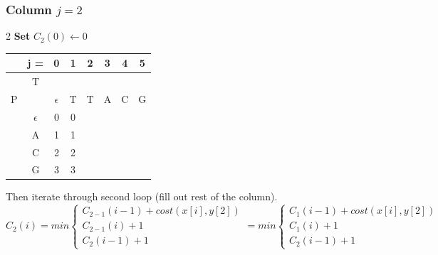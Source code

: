\subsubsection*{Column $j = 2$}
\begin{multicols}{2}
    \textbf{Set} $C_2(0) \gets 0$

    \begin{center}
        \begin{tabular}{|c c|c|c|c|c|c|c|} \hline
        &   j =  &  0           &   1   &   2   &   3   &   4   &   5   \\ \hline
        &   T    &              &       &       &       &       &       \\
        P   &        &  $\epsilon$  &   T   &   T   &   A   &   C   &   G   \\ \hline
        & $\epsilon$ &       0      & 0     &\ccr0  &       &       &       \\ \hline
        &    A   &     1        &  1    &       &       &       &       \\ \hline
        &    C   & 2            &  2    &       &       &       &       \\ \hline
        &    G   & 3            &   3   &       &       &       &       \\ \hline
        \end{tabular}
    \end{center}
\end{multicols}

Then iterate through second loop (fill out rest of the column).
\[
    C_2(i) = min \begin{cases}
                     C_{2-1}(i-1) + cost(x[i], y[2]) \\
                     C_{2-1}(i) + 1 \\
                     C_2(i-1) + 1
    \end{cases} =  min \begin{cases}
                           C_{1}(i-1) + cost(x[i], y[2]) \\
                           C_{1}(i) + 1 \\
                           C_2(i-1) + 1
    \end{cases}
\]

